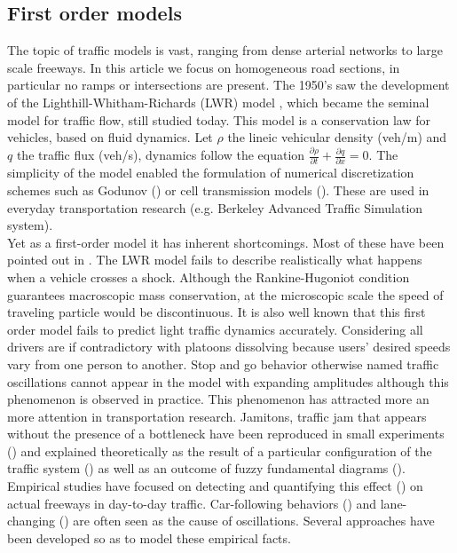 \documentclass[preprint]{elsarticle}
\begin{document}
\subsection{First order models}
The topic of traffic models is vast, ranging from dense arterial networks
to large scale freeways. In this article we focus on homogeneous road
sections, in particular no ramps or intersections are present. The
1950\textquoteright s saw the development of the Lighthill-Whitham-Richards
(LWR) model \cite{LW,Richards}, which became the seminal model for
traffic flow, still studied today. This model is a conservation law
for vehicles, based on fluid dynamics. Let $\rho$ the lineic vehicular
density (veh/m) and $q$ the traffic flux (veh/s), dynamics follow
the equation $\frac{\partial\rho}{\partial t}+\frac{\partial q}{\partial x}=0$.
The simplicity of the model enabled the formulation of numerical discretization
schemes such as Godunov (\cite{godunov,Osher}) or cell transmission
models (\cite{daganzo1994cell,daganzo1995cell}). These are used in
everyday transportation research (e.g. Berkeley Advanced Traffic
Simulation system).\\
Yet as a first-order model it has inherent shortcomings. Most of these
have been pointed out in \cite{Dag_requiem}. The LWR model fails
to describe realistically what happens when a vehicle crosses a shock.
Although the Rankine-Hugoniot condition guarantees macroscopic mass
conservation, at the microscopic scale the speed of traveling particle
would be discontinuous. It is also well known that this first order
model fails to predict light traffic dynamics accurately. Considering
all drivers are if contradictory with platoons dissolving because
users' desired speeds vary from one person to another. Stop and go
behavior otherwise named traffic oscillations cannot appear in the
model with expanding amplitudes although this phenomenon is observed
in practice. This phenomenon has attracted more an more attention
in transportation research. Jamitons, traffic jam that appears without
the presence of a bottleneck have been reproduced in small experiments
(\cite{Jamitons2008,Flynn08onjamitons}) and explained theoretically
as the result of a particular configuration of the traffic system
(\cite{Flynn09self-sustainednonlinear}) as well as an outcome of
fuzzy fundamental diagrams (\cite{Jamitons-multi-valued-fund}). Empirical
studies have focused on detecting and quantifying this effect (\cite{zielke2008empirical})
on actual freeways in day-to-day traffic. Car-following behaviors
(\cite{Mauch02freewaytraffic}) and lane-changing (\cite{lanechangin2005,lanechanging2007})
are often seen as the cause of oscillations. Several approaches have
been developed so as to model these empirical facts.
\end{document}
